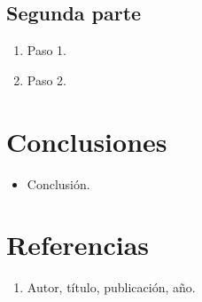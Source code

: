 \documentclass[11pt,a4paper]{article}
\begin{document}

\subsection{Segunda parte}

\begin{enumerate}
  \item Paso 1.
  \item Paso 2.
\end{enumerate}

\section{Conclusiones}

\begin{itemize}
  \item Conclusión.
\end{itemize}

\section{Referencias}

\begin{enumerate}
  \item Autor, título, publicación, año.
\end{enumerate}
\end{document}
